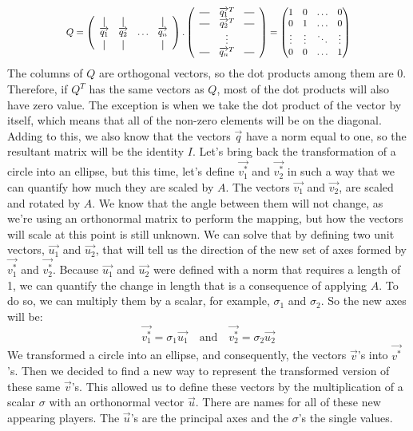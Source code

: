 \documentclass[600paper, 11pt,twoside,openany]{kdp}
\begin{document}
\[\scalebox{.85}{$
Q = 
\left(
  \begin{array}{cccc}
    \vertbar & \vertbar &        & \vertbar \\
    \overrightarrow{q_{1}}    & \overrightarrow{q_{2}}    & \ldots & \overrightarrow{q_{n}}    \\
    \vertbar & \vertbar &        & \vertbar 
  \end{array}
\right).
\left(
  \begin{array}{ccc}
    \horzbar & \overrightarrow{q_{1}}^T & \horzbar \\
    \horzbar & \overrightarrow{q_{2}}^T & \horzbar \\
             & \vdots    &          \\
    \horzbar & \overrightarrow{q_{n}}^T & \horzbar
  \end{array}
\right) = 
\begin{pmatrix}
1 & 0 & \hdots & 0 \\
0 & 1 & \hdots & 0 \\
\vdots & \vdots & \ddots & \vdots \\
0 & 0 & \hdots & 1 
\end{pmatrix}$}
\]
\indent The columns of $Q$ are orthogonal vectors, so the dot products among them are 0. Therefore, if $Q^T$ has the same vectors as $Q$, most of the dot products will also have zero value. The exception is when we take the dot product of the vector by itself, which means that all of the non-zero elements will be on the diagonal. Adding to this, we also know that the vectors $\overrightarrow{q}$  have a norm equal to one, so the resultant matrix will be the identity $I$. Let’s bring back the transformation of a circle into an ellipse, but this time, let’s define $\overrightarrow{v_1^*}$ and $\overrightarrow{v_2^*}$ in such a way that we can quantify how much they are scaled by $A$. The vectors $\overrightarrow{v_1}$ and $\overrightarrow{v_2}$, are scaled and rotated by $A$. We know that the angle between them will not change, as we’re using an orthonormal matrix to perform the mapping, but how the vectors will scale at this point is still unknown. We can solve that by defining two unit vectors, $\overrightarrow{u_1}$ and $\overrightarrow{u_2}$, that will tell us the direction of the new set of axes formed by $\overrightarrow{v_1^*}$ and $\overrightarrow{v_2^*}$. Because $\overrightarrow{u_1}$ and $\overrightarrow{u_2}$ were defined with a norm that requires a length of 1, we can quantify the change in length that is a consequence of applying $A$. To do so, we can multiply them by a scalar, for example, $\sigma_1$ and $\sigma_2$. So the new axes will be:
\[\overrightarrow{v_1^*} = \sigma_1 \overrightarrow{u_1}  \quad \textrm{and}  \quad \overrightarrow{v_2^*} = \sigma_2 \overrightarrow{u_2}\]
\indent We transformed a circle into an ellipse, and consequently, the vectors $\overrightarrow{v}$'s into $\overrightarrow{v^*}$'s. Then we decided to find a new way to represent the transformed version of these same $\overrightarrow{v}$'s. This allowed us to define these vectors by the multiplication of a scalar $\sigma$ with an orthonormal vector $\overrightarrow{u}$. There are names for all of these new appearing players. The $\overrightarrow{u}$'s are the principal axes and the $\sigma$'s the single values.
\end{document}

